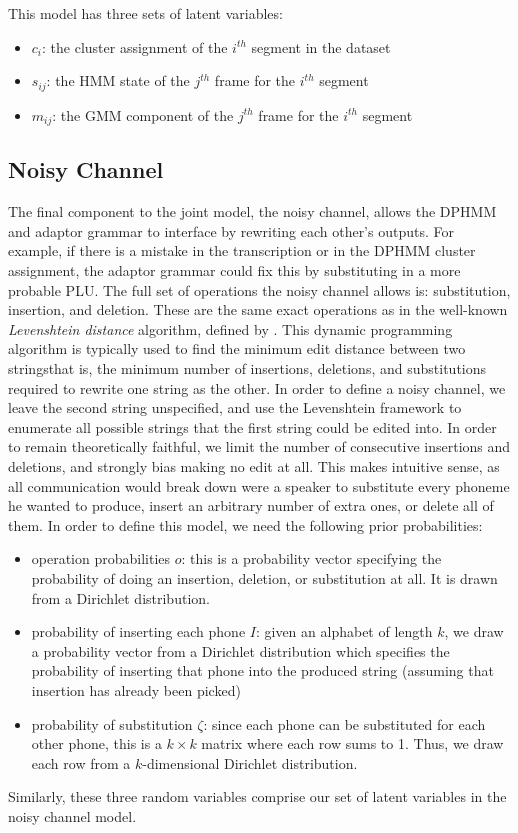 \documentclass[12pt,letterpaper]{article}
\begin{document}
This model has three sets of latent variables: 
\begin{itemize}
\item $c_i$: the cluster assignment of the $i^{th}$ segment in the dataset
\item $s_{ij}$: the HMM state of the $j^{th}$ frame for the $i^{th}$ segment
\item $m_{ij}$: the GMM component of the $j^{th}$ frame for the $i^{th}$ segment
\end{itemize}


\subsection{Noisy Channel}
The final component to the joint model, the noisy channel, allows the DPHMM and adaptor grammar to interface by rewriting each other's outputs. For example, if there is a mistake in the transcription or in the DPHMM cluster assignment, the adaptor grammar could fix this by substituting in a more probable PLU. The full set of operations the noisy channel allows is: substitution, insertion, and deletion. These are the same exact operations as in the well-known \textit{Levenshtein distance} algorithm, defined by \citet{levenshtein:1966}. This dynamic programming algorithm is typically used to find the minimum edit distance between two strings\textemdash that is, the minimum number of insertions, deletions, and substitutions required to rewrite one string as the other. In order to define a noisy channel, we leave the second string unspecified, and use the Levenshtein framework to enumerate all possible strings that the first string could be edited into. In order to remain theoretically faithful, we limit the number of consecutive insertions and deletions, and strongly bias making no edit at all. This makes intuitive sense, as all communication would break down were a speaker to substitute every phoneme he wanted to produce, insert an arbitrary number of extra ones, or delete all of them. In order to define this model, we need the following prior probabilities: 
\begin{itemize}
    \item operation probabilities $o$: this is a probability vector specifying the probability of doing an insertion, deletion, or substitution at all. It is drawn from a Dirichlet distribution.
    \item probability of inserting each phone $I$: given an alphabet of length $k$, we draw a probability vector from a Dirichlet distribution which specifies the probability of inserting that phone into the produced string (assuming that insertion has already been picked)
    \item probability of substitution $\zeta$: since each phone can be substituted for each other phone, this is a $k\times k$ matrix where each row sums to 1. Thus, we draw each row from a $k$-dimensional Dirichlet distribution. 
\end{itemize}
Similarly, these three random variables comprise our set of latent variables in the noisy channel model. 
\end{document}
